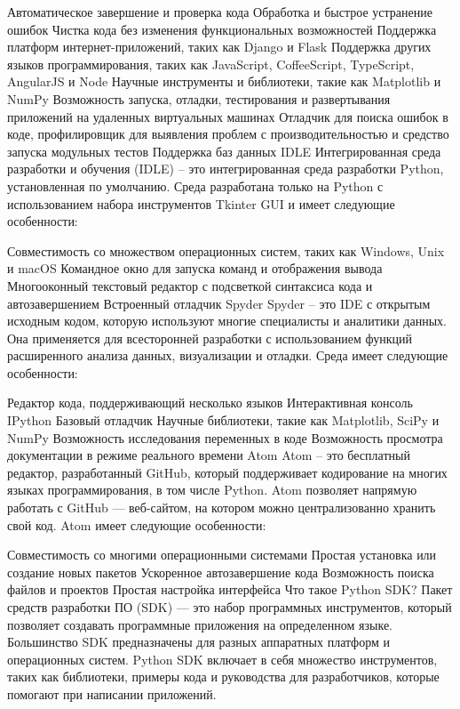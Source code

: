 Автоматическое завершение и проверка кода
Обработка и быстрое устранение ошибок
Чистка кода без изменения функциональных возможностей
Поддержка платформ интернет-приложений, таких как Django и Flask
Поддержка других языков программирования, таких как JavaScript, CoffeeScript, TypeScript, AngularJS и Node
Научные инструменты и библиотеки, такие как Matplotlib и NumPy
Возможность запуска, отладки, тестирования и развертывания приложений на удаленных виртуальных машинах
Отладчик для поиска ошибок в коде, профилировщик для выявления проблем с производительностью и средство запуска модульных тестов
Поддержка баз данных
IDLE
Интегрированная среда разработки и обучения (IDLE) – это интегрированная среда разработки Python, установленная по умолчанию. Среда разработана только на Python с использованием набора инструментов Tkinter GUI и имеет следующие особенности:

Совместимость со множеством операционных систем, таких как Windows, Unix и macOS
Командное окно для запуска команд и отображения вывода
Многооконный текстовый редактор с подсветкой синтаксиса кода и автозавершением
Встроенный отладчик 
Spyder
Spyder – это IDE с открытым исходным кодом, которую используют многие специалисты и аналитики данных. Она применяется для всесторонней разработки с использованием функций расширенного анализа данных, визуализации и отладки. Среда имеет следующие особенности:

Редактор кода, поддерживающий несколько языков
Интерактивная консоль IPython
Базовый отладчик
Научные библиотеки, такие как Matplotlib, SciPy и NumPy
Возможность исследования переменных в коде
Возможность просмотра документации в режиме реального времени
Atom
Atom – это бесплатный редактор, разработанный GitHub, который поддерживает кодирование на многих языках программирования, в том числе Python. Atom позволяет напрямую работать с GitHub — веб-сайтом, на котором можно централизованно хранить свой код. Atom имеет следующие особенности:

Совместимость со многими операционными системами 
Простая установка или создание новых пакетов
Ускоренное автозавершение кода
Возможность поиска файлов и проектов
Простая настройка интерфейса
Что такое Python SDK?
Пакет средств разработки ПО (SDK) — это набор программных инструментов, который позволяет создавать программные приложения на определенном языке. Большинство SDK предназначены для разных аппаратных платформ и операционных систем. Python SDK включает в себя множество инструментов, таких как библиотеки, примеры кода и руководства для разработчиков, которые помогают при написании приложений.

